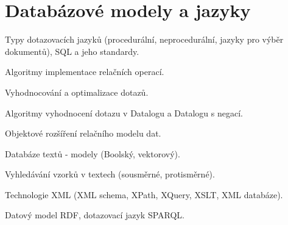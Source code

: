 \newpage
\section{Databázové modely a jazyky}
\begin{pozadavky}
\begin{pitemize}
\item Typy dotazovacích jazyků (procedurální, neprocedurální, jazyky pro výběr dokumentů), SQL a jeho standardy.
\item Algoritmy implementace relačních operací.
\item Vyhodnocování a optimalizace dotazů.
\item Algoritmy vyhodnocení dotazu v Datalogu a Datalogu s negací.
\item Objektové rozšíření relačního modelu dat.
\item Databáze textů - modely (Boolský, vektorový).
\item Vyhledávání vzorků v textech (sousměrné, protisměrné).
\item Technologie XML (XML schema, XPath, XQuery, XSLT, XML databáze).
\item Datový model RDF, dotazovací jazyk SPARQL.
\end{pitemize}
\end{pozadavky}